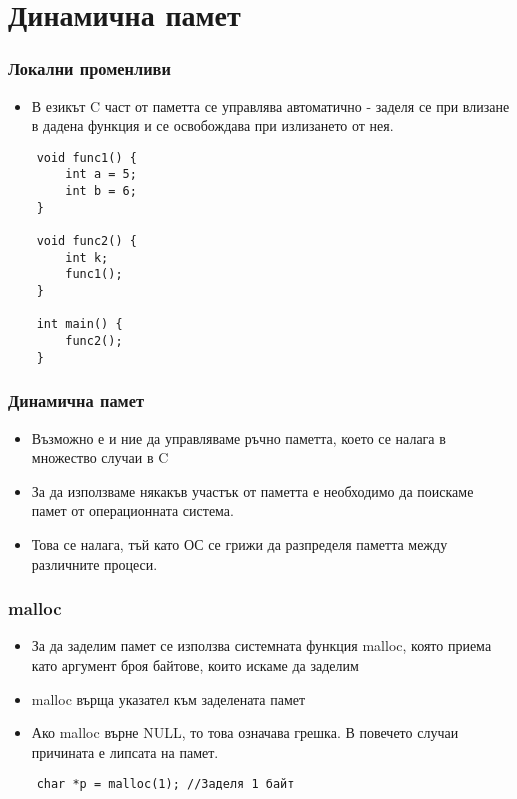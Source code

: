 \documentclass[ignorenonframetext, hyperref=unicode]{beamer}
\begin{document}
\section{Динамична памет}

\begin{frame}[containsverbatim]
\frametitle{Локални променливи}
\begin{itemize}
  \item В езикът C част от паметта се управлява автоматично - заделя се при влизане в дадена функция и се освобождава при излизането от нея.
\end{itemize}
\begin{lstlisting}
	void func1() {
		int a = 5;
		int b = 6;
	}
	
	void func2() {
		int k;
		func1();
	}
	
	int main() {
		func2();
	}

\end{lstlisting}
\end{frame}

\begin{frame}[containsverbatim]
\frametitle{Динамична памет}
\begin{itemize}
  \item Възможно е и ние да управляваме ръчно паметта, което се налага в множество случаи в C
  \item За да използваме някакъв участък от паметта е необходимо да поискаме памет от операционната система.
  \item Това се налага, тъй като ОС се грижи да разпределя паметта между различните процеси.
\end{itemize}
\end{frame}

\begin{frame}[containsverbatim]
\frametitle{malloc}
\begin{itemize}
  \item За да заделим памет се използва системната функция malloc, която приема като аргумент броя байтове, които искаме да заделим
  \item malloc върща указател към заделената памет
  \item Ако malloc върне NULL, то това означава грешка. В повечето случаи причината е липсата на памет.
\end{itemize}
\begin{lstlisting}
	char *p = malloc(1); //Заделя 1 байт
\end{lstlisting}
\end{frame}
\end{document}
